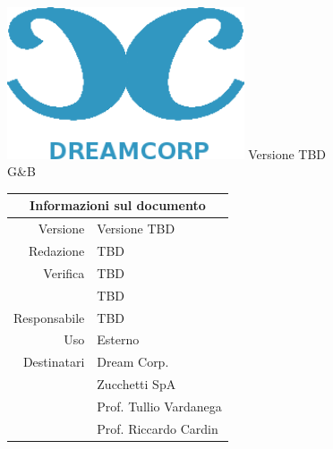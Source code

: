 \documentclass[12pt]{article}
\title{\myfont{Glossario}}
\author{Dream Corp.}
\date{ \myfont 05-12-2018}
\newcommand{\red}{TBD}
\newcommand{\verp}{TBD}
\newcommand{\vers}{TBD}
\newcommand{\res}{TBD}
\newcommand{\version}{Versione TBD}
\newcommand{\use}{Esterno}
\begin{document}
    
\maketitle
\begin{center}
	\includegraphics[width = 70mm]{../../logo.png}\newline
	\huge \version 
	\\G\&B
	
	\begin{table}[h!]
		\centering
		\begin{tabular}{r|l}
			\multicolumn{2}{c}{Informazioni sul documento}\\
			\hline
			Versione & \version \\
			Redazione & \red \\
			Verifica & \verp\\
			& \vers\\
			Responsabile & \res\\
			Uso & \use\\
			Destinatari & Dream Corp. \\
			& Zucchetti SpA\\
			& Prof. Tullio Vardanega\\
			& Prof. Riccardo Cardin\\
		\end{tabular}
	\end{table}
	
\end{center}
\newpage

    \clearpage
    \glsaddall

    \printglossary[title=Glossario,toctitle=Glossario]
\end{document}
